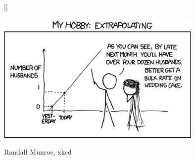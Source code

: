 \documentclass[12pt]{article}\usepackage[]{graphicx}\usepackage[svgnames]{xcolor}
\begin{document}
\begin{figure}[h!]
[\FBwidth]
{\caption*{Randall Munroe, xkcd}}
{\includegraphics[width=10cm]{extrapolating.png}}
\end{figure}
\end{document}
